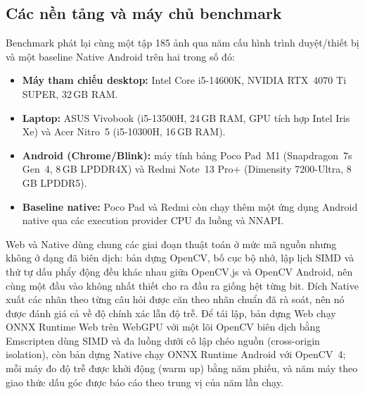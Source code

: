 \documentclass[conference]{IEEEtran}
\begin{document}
\subsection{Các nền tảng và máy chủ benchmark}
Benchmark phát lại cùng một tập 185 ảnh qua năm cấu hình trình duyệt/thiết bị và
một baseline Native Android trên hai trong số đó:
\begin{itemize}[leftmargin=*, itemsep=1pt, topsep=2pt]
  \item   \textbf{Máy tham chiếu desktop:} Intel Core i5-14600K, NVIDIA
  RTX~4070 Ti SUPER, 32\,GB RAM.
  \item \textbf{Laptop:} ASUS Vivobook (i5-13500H, 24\,GB RAM, GPU tích hợp Intel
  Iris Xe) và Acer Nitro~5 (i5-10300H, 16\,GB RAM).
  \item \textbf{Android (Chrome/Blink):} máy tính bảng Poco Pad~M1 (Snapdragon~7s
  Gen~4, 8\,GB LPDDR4X) và Redmi Note~13 Pro+ (Dimensity 7200-Ultra,
  8\,GB LPDDR5).

  \item \textbf{Baseline native:} Poco Pad và Redmi còn chạy thêm một ứng dụng
  Android native qua các execution provider CPU đa luồng và NNAPI.
\end{itemize}
Web và Native dùng chung các giai đoạn thuật toán ở mức mã nguồn nhưng không ở
dạng đã biên dịch: bản dựng OpenCV, bố cục bộ nhớ, lập lịch SIMD và thứ tự dấu
phẩy động đều khác nhau giữa OpenCV.js và OpenCV Android, nên cùng một đầu vào
không nhất thiết cho ra đầu ra giống hệt từng bit. Đích Native xuất các nhãn theo
từng câu hỏi được căn theo nhãn chuẩn đã rà soát, nên nó được đánh giá cả về độ
chính xác lẫn độ trễ. Để tái lập, bản dựng Web chạy ONNX Runtime Web trên WebGPU
với một lõi OpenCV biên dịch bằng Emscripten dùng SIMD và đa luồng dưới cô lập
chéo nguồn (cross-origin isolation), còn bản dựng Native chạy ONNX Runtime Android
với OpenCV~4; mỗi máy đo độ trễ được khởi động (warm up) bằng năm phiếu, và năm
máy theo giao thức dấu góc được báo cáo theo trung vị của năm lần chạy.
\end{document}
